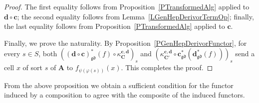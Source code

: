 \documentclass[a4paper, reqno]{amsbook}
\newcommand{\gd}{\mathfrak{gd}}              %
\theoremstyle{plain}
\theoremstyle{definition}
\begin{document}
\begin{proof}
The first equality follows from Proposition~\ref{PTransformedAlg} applied to $\mathbf{d}\circ\mathbf{c}$; the second equality follows from Lemma~\ref{LGenHepDerivorTermOp}; finally, the last equality follows from Proposition~\ref{PTransformedAlg} applied to $\mathbf{c}$.

Finally, we prove the naturality.
By Proposition~\ref{PGenHepDerivorFunctor}, for every $s\in S$, both $((\mathbf{d}\circ\mathbf{c})^{\ast}_{\gd}(f)\circ\kappa^{\mathbf{c},\mathbf{d}}_{\mathbf{C}})_{s}$ and $(\kappa^{\mathbf{c},\mathbf{d}}_{\mathbf{C}'}\circ\mathbf{c}^{\ast}_{\gd}(\mathbf{d}^{\ast}_{\gd}(f)))_{s}$ send a cell $x$ of sort $s$ of $\mathbf{A}$ to $f_{\psi(\varphi(s))}(x)$. This completes the proof.
\end{proof}

From the above proposition we obtain a sufficient condition for the functor induced by a composition to agree with the composite of the induced functors.
\end{document}
